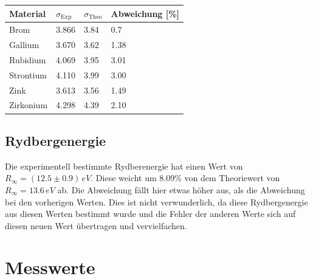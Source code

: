 \begin{minipage}{\linewidth}
\begin{table}[H]
        \centering
    \begin{tabular}{llll}
        \toprule
        Material & $\sigma_\text{Exp}$ & $\sigma_\text{Theo}$& Abweichung [\%] \\
        \midrule
        Brom        & 3.866 & 3.84 & 0.7 \\
        Gallium     & 3.670 & 3.62 & 1.38 \\
        Rubidium    & 4.069 & 3.95 & 3.01 \\
        Strontium   & 4.110 & 3.99 & 3.00 \\
        Zink        & 3.613 & 3.56 & 1.49 \\
        Zirkonium   & 4.298 & 4.39 & 2.10 \\
        \bottomrule   
    \end{tabular}
    
    \label{tab:s}
\end{table}
\end{minipage}

\subsection{Rydbergenergie}

Die experimentell bestimmte Rydberenergie hat einen Wert von $R_\infty = (12.5\pm 0.9)\, eV$. Diese weicht um 8.09\% von dem Theoriewert von $R_\infty = 13.6\, eV$ ab.
Die Abweichung fällt hier etwas höher aus, als die Abweichung bei den vorherigen Werten. Dies ist nicht verwunderlich, da diese Rydbergenergie aus diesen Werten bestimmt wurde und die Fehler der anderen Werte sich auf diesen neuen Wert übertragen und vervielfachen.
    


\section{Messwerte}

